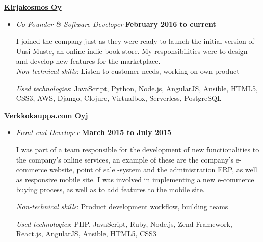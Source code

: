 \documentclass[10pt,english,a4paper]{article}
\newenvironment{outerlist}[1][\enskip\textbullet]%
        {\begin{itemize}[#1]}{\end{itemize}%
         \vspace{-.6\baselineskip}}
\newcommand{\blankline}{\quad\pagebreak[2]}
\begin{document}
\href{http://www.uusimuste.fi/}{\textbf{Kirjakosmos Oy}}
\begin{outerlist}

  \item[] \textit{Co-Founder \& Software Developer}%
  \hfill \textbf{February 2016 to current}
  \par
  I joined the company just as they were ready to launch the initial version of Uusi Muste, an online indie book store.
  My responsibilities were to design and develop new features for the marketplace.\\

  \emph{Non-technical skills}: Listen to customer needs, working on own product
  \par
  \emph{Used technologies}: JavaScript, Python, Node.js, AngularJS, Ansible, HTML5, CSS3, AWS, Django, Clojure, Virtualbox, Serverless, PostgreSQL\\
\end{outerlist}
\blankline

\href{http://verkkokauppa.com/}{\textbf{Verkkokauppa.com Oyj}}
\begin{outerlist}
  \item[] \textit{Front-end Developer}%
  \hfill \textbf{March 2015 to July 2015}\par
    I was part of a team responsible for the development of new functionalities to the company’s online services, an example of these are the company’s e-commerce website, point of sale -system and the administration ERP, as well as responsive mobile site.
    I was involved in implementing a new e-commerce buying process, as well as to add features to the mobile site.
    \par
    \emph{Non-technical skills}: Product development workflow, building teams
    \par
    \emph{Used technologies}: PHP, JavaScript, Ruby, Node.js, Zend Framework, React.js, AngularJS, Ansible, HTML5, CSS3\\
\end{outerlist}
\blankline
\end{document}
